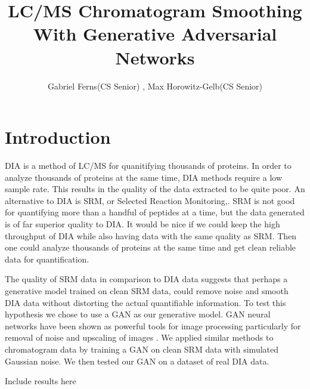 \documentclass[12pt]{article}
\title{LC/MS Chromatogram Smoothing With Generative Adversarial Networks}
\author{Gabriel Ferns(CS Senior) , Max Horowitz-Gelb(CS Senior)}
\begin{document}
\maketitle


\section{Introduction}
DIA \cite{DIA} is a method of LC/MS for quanitifying thousands of proteins. In order to analyze thousands of proteins at the same time, DIA methods require a low sample rate. This results in the quality of the data extracted to be quite poor. An alternative to DIA is SRM, or Selected Reaction Monitoring,\cite{SRM}. SRM is not good for quantifying more than a handful of peptides at a time, but the data generated is of far superior quality to DIA. It would be nice if we could keep the high throughput of DIA while also having data with the same quality as SRM. Then one could analyze thousands of proteins at the same time and get clean reliable data for quantification.

The quality of SRM data in comparison to DIA data suggests that perhaps a generative model trained on clean SRM data, could remove noise and smooth DIA data without distorting the actual quantifiable information. To test this hypothesis we chose to use a GAN as our generative model. GAN neural networks have been shown as powerful tools for image processing particularly for removal of noise and upscaling of images \cite{SRGAN}\cite{DE_RAIN}. We applied similar methods to chromatogram data by training a GAN on clean SRM data with simulated Gaussian noise. We then tested our GAN on a dataset of real DIA data.

\color{red}
Include results here
\color{black}
\end{document}
